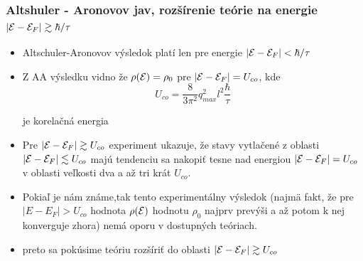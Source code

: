 \documentclass[
	11pt, %
]{beamer}
\begin{document}
\begin{frame}
\frametitle{Altshuler - Aronovov jav, rozšírenie teórie na energie $|\mathcal{E} - \mathcal{E}_F| \gtrsim \hbar/\tau$}
\begin{itemize}
\item Altschuler-Aronovov výsledok platí len pre energie $|\mathcal{E} - \mathcal{E}_F| < \hbar/\tau$
\item Z AA výsledku vidno že $\rho(\mathcal{E}) = \rho_0$ pre $|\mathcal{E}-\mathcal{E}_F| =  U_{co}$, kde
\begin{equation}
\label{eq:aa_U co korelenergia}
 U_{co} = \frac{8}{3\pi^{2}} q_{max}^2 l^2 \frac{\hbar}{\tau} 
\end{equation}

je korelačná energia
\item Pre $|\mathcal{E}-\mathcal{E}_F| \gtrsim  U_{co}$ experiment ukazuje, že stavy vytlačené z oblasti $|\mathcal{E}-\mathcal{E}_F| \lesssim  U_{co}$ majú tendenciu sa nakopiť tesne
nad energiou $|\mathcal{E}-\mathcal{E}_F| =  U_{co}$ v oblasti veľkosti dva a až tri krát $U_{co}$.
\item Pokiaľ je nám známe,tak tento experimentálny výsledok (najmä fakt, že  pre $|E-E_F| > U_{co}$ hodnota $\rho(\mathcal{E})$ hodnotu $\rho_0$
najprv prevýši a až potom k nej konverguje zhora) nemá oporu v dostupných teóriach.
\item preto sa pokúsime teóriu rozšíriť do oblasti  $|\mathcal{E}-\mathcal{E}_F| \gtrsim U_{co}$
\end{itemize}
\end{frame}
\end{document}
